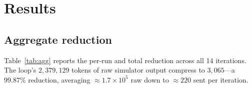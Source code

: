 \documentclass[10pt,twocolumn]{article}
\begin{document}
\section{Results}
\label{sec:results}

\subsection{Aggregate reduction}

Table~\ref{tab:agg} reports the per-run and total reduction across all 14
iterations. The loop's $2{,}379{,}129$ tokens of raw simulator output compress to
$3{,}065$---a $99.87\%$ reduction, averaging $\approx\!1.7\times10^{5}$ raw down to
$\approx\!220$ sent per iteration.

\begin{table}[t]
\centering\small
\caption{Requirement-aware reduction over 14 real iterations (4-char/token
estimate). \emph{sent} is the verdict actually forwarded to the model.}
\label{tab:agg}
\setlength{\tabcolsep}{4pt}
\end{table}
\end{document}
